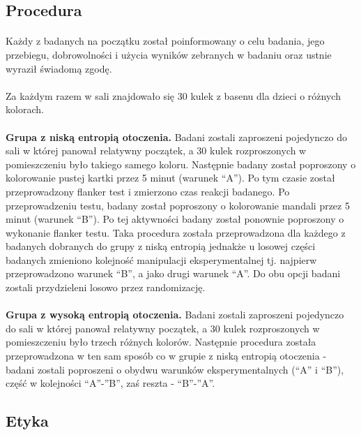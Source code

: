 \documentclass[12pt,a4paper,final,oneside,onecolumn,titlepage]{article}
\begin{document}
\subsection*{\normalsize{\textbf{Procedura}}}
\paragraph{}
Każdy z badanych na początku został poinformowany o celu badania, jego przebiegu, dobrowolności i użycia wyników zebranych w badaniu oraz ustnie wyraził świadomą zgodę.
\paragraph{}
Za każdym razem w sali znajdowało się 30 kulek z basenu dla dzieci o różnych kolorach.
\paragraph{}
\textbf{Grupa z niską entropią otoczenia.} Badani zostali zaproszeni pojedynczo do sali w której panował relatywny początek, a 30 kulek rozproszonych w pomieszczeniu było takiego samego koloru. Następnie badany został poproszony o kolorowanie pustej kartki przez 5 minut (warunek “A”). Po tym czasie został przeprowadzony flanker test i zmierzono czas reakcji badanego. Po przeprowadzeniu testu, badany został poproszony o kolorowanie mandali przez 5 minut (warunek “B”). Po tej aktywności badany został ponownie poproszony o wykonanie flanker testu. Taka procedura została przeprowadzona dla każdego z badanych dobranych do grupy z niską entropią jednakże u losowej części badanych zmieniono kolejność manipulacji eksperymentalnej tj. najpierw przeprowadzono warunek “B”, a jako drugi warunek “A”. Do obu opcji badani zostali przydzieleni losowo przez randomizację.
\paragraph{}
\textbf{Grupa z wysoką entropią otoczenia.} Badani zostali zaproszeni pojedynczo do sali w której panował relatywny początek, a  30 kulek rozproszonych w pomieszczeniu było trzech różnych kolorów. Następnie procedura została przeprowadzona w ten sam sposób co w grupie z niską entropią otoczenia - badani zostali poproszeni o obydwu warunków eksperymentalnych (“A” i “B”), część w kolejności “A”-”B”, zaś reszta -  “B”-”A”.
\subsection*{\normalsize{\textbf{Etyka}}}
\end{document}
